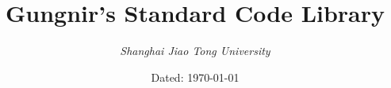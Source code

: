 \documentclass[landscape, oneside, a4paper, cs4size]{book}
\begin{document}
\scriptsize
	\title{\textbf{\LARGE{Gungnir's Standard Code Library}}}
	\author{\emph{Shanghai Jiao Tong University}}
	\date{Dated: \today}
	\maketitle
	\newpage
	\begin{multicols}{2}
		\tableofcontents
		\begin{spacing}{0.8}
			\def \source {../source}
			
		\end{spacing}
	\end{multicols}
\end{document}
